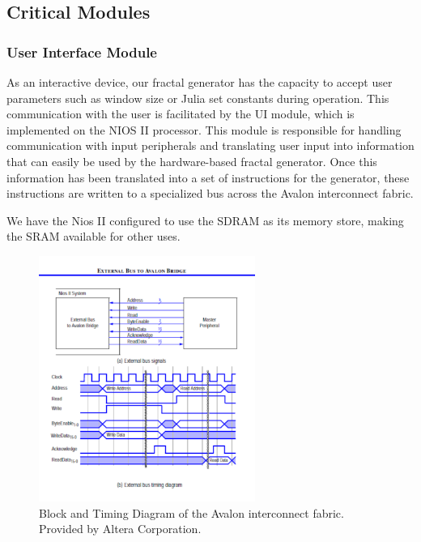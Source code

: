 \documentclass{article}
\begin{document}
\subsection{Critical Modules}

\subsubsection{User Interface Module}

As an interactive device, our fractal generator has the capacity to accept user parameters such as window size or
Julia set constants during operation. This communication with the user is facilitated by the UI module, which is 
implemented on the NIOS II processor. This module is responsible for handling communication with input peripherals
and translating user input into information that can easily be used by the hardware-based fractal generator. Once 
this information has been translated into a set of instructions for the generator, these instructions are written
to a specialized bus across the Avalon interconnect fabric.

We have the Nios II configured to use the SDRAM as its memory store, making the SRAM available for other uses.

\begin{figure}
  \centering
    \includegraphics[width=200pt]{block_diagrams/nbat.pdf}
  \caption{Block and Timing Diagram of the Avalon interconnect fabric. Provided by Altera Corporation.}
\end{figure}
\end{document}

